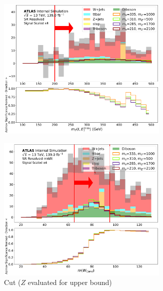   \begin{figure}[htbp]
  \centering
    \begin{subfigure}[t]{0.48\textwidth}
    \centering
     \includegraphics[width = 0.9\textwidth]{Figures/5/SR1L_Resolved/mT_lep_met_normSig_N_1.pdf}
    \caption{\mtlepmet}
    \end{subfigure}
    \begin{subfigure}[t]{0.48\textwidth}
    \centering
     \includegraphics[width = 0.9\textwidth]{Figures/5/SR1L_Resolved_mWlt/WCand_m_normSig_N_1.pdf}
     \caption{\Wcandm Cut (\(Z\) evaluated for upper bound)}
    \end{subfigure}
    \begin{subfigure}[t]{0.48\textwidth}

\end{subfigure}
\end{figure}
